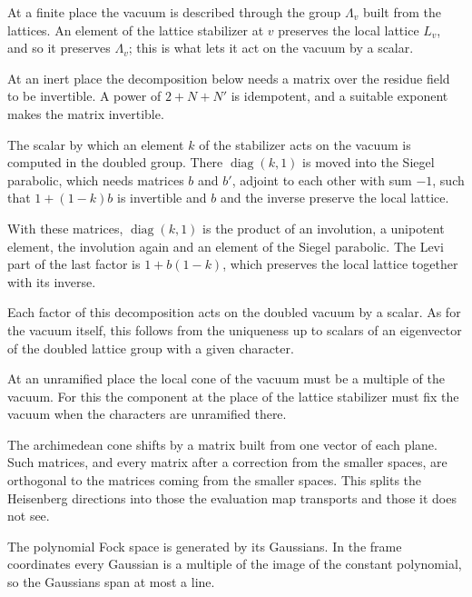 At a finite place the vacuum is described through the group $\Lambda_v$ built
from the lattices. An element of the lattice stabilizer at $v$ preserves the
local lattice $L_v$, and so it preserves $\Lambda_v$; this is what lets it act on
the vacuum by a scalar.

At an inert place the decomposition below needs a matrix over the residue field
to be invertible. A power of $2+N+N'$ is idempotent, and a suitable exponent
makes the matrix invertible.

The scalar by which an element $k$ of the stabilizer acts on the vacuum is
computed in the doubled group. There $\operatorname{diag}(k,1)$ is moved into the
Siegel parabolic, which needs matrices $b$ and $b'$, adjoint to each other with
sum $-1$, such that $1+(1-k)b$ is invertible and $b$ and the inverse preserve the
local lattice.

With these matrices, $\operatorname{diag}(k,1)$ is the product of an involution, a
unipotent element, the involution again and an element of the Siegel parabolic.
The Levi part of the last factor is $1+b(1-k)$, which preserves the local
lattice together with its inverse.

Each factor of this decomposition acts on the doubled vacuum by a scalar. As for
the vacuum itself, this follows from the uniqueness up to scalars of an
eigenvector of the doubled lattice group with a given character.

At an unramified place the local cone of the vacuum must be a multiple of the
vacuum. For this the component at the place of the lattice stabilizer must fix
the vacuum when the characters are unramified there.

The archimedean cone shifts by a matrix built from one vector of each plane. Such
matrices, and every matrix after a correction from the smaller spaces, are
orthogonal to the matrices coming from the smaller spaces. This splits the
Heisenberg directions into those the evaluation map transports and those it
does not see.

The polynomial Fock space is generated by its Gaussians. In the frame
coordinates every Gaussian is a multiple of the image of the constant
polynomial, so the Gaussians span at most a line.

